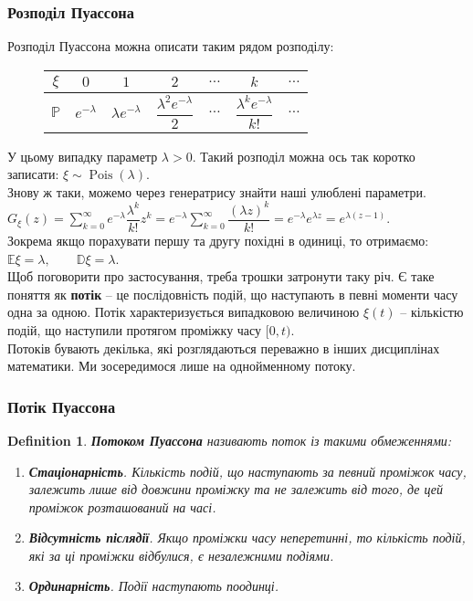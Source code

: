 \documentclass[a4paper, 10pt]{article}
\theoremstyle{theoremdd}
\newtheorem{definition}[theorem]{Definition}
\DeclareMathOperator{\Pois}{Pois}
\begin{document}
\subsubsection{Розподіл Пуассона}
Розподіл Пуассона можна описати таким рядом розподілу:
\begin{figure}[H]
\centering
\begin{tabular}{c|c|c|c|c|c|c}
$\xi$ & $0$ & $1$ & $2$ & $\dots$ & $k$ & $\dots$ \\
\hline
$\mathbb{P}$ & $e^{-\lambda}$ & $\lambda e^{-\lambda}$ & $\dfrac{\lambda^2e^{-\lambda}}{2}$ & $\dots$ & $\dfrac{\lambda^k e^{-\lambda}}{k!}$ & $\dots$
\end{tabular}
\end{figure}
\noindent
У цьому випадку параметр $\lambda > 0$. Такий розподіл можна ось так коротко записати: $\xi \sim \Pois(\lambda)$.\\
Знову ж таки, можемо через генератрису знайти наші улюблені параметри.\\
$G_\xi(z) = \displaystyle\sum_{k=0}^\infty e^{-\lambda} \dfrac{\lambda^k}{k!}z^k = e^{-\lambda} \sum_{k=0}^\infty \dfrac{(\lambda z)^k}{k!} = e^{-\lambda} e^{\lambda z} = e^{\lambda (z-1)}$.\\
Зокрема якщо порахувати першу та другу похідні в одиниці, то отримаємо:\\
$\mathbb{E}\xi = \lambda, \qquad \mathbb{D}\xi = \lambda$.\\
Щоб поговорити про застосування, треба трошки затронути таку річ. Є таке поняття як \textbf{потік} -- це послідовність подій, що наступають в певні моменти часу одна за одною. Потік характеризується випадковою величиною $\xi(t)$ -- кількістю подій, що наступили протягом проміжку часу $[0,t)$.\\
Потоків бувають декілька, які розглядаються переважно в інших дисциплінах математики. Ми зосередимося лише на однойменному потоку.

\subsubsection*{Потік Пуассона}
\begin{definition}
\textbf{Потоком Пуассона} називають поток із такими обмеженнями:
\begin{enumerate}[nosep,wide=0pt,label={\arabic*.}]
\item \textbf{Стаціонарність}. Кількість подій, що наступають за певний проміжок часу, залежить лише від довжини проміжку та не залежить від того, де цей проміжок розташований на часі.
\item \textbf{Відсутність післядії}. Якщо проміжки часу неперетинні, то кількість подій, які за ці проміжки відбулися, є незалежними подіями.
\item \textbf{Ординарність}. Події наступають поодинці.
\end{enumerate}
\end{definition}
\end{document}
